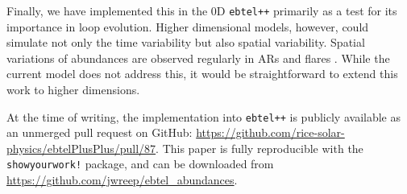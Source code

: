 \documentclass[twocolumn]{aastex631}
\begin{document}
Finally, we have implemented this in the 0D \texttt{ebtel++} primarily as a test for its importance in loop evolution.  Higher dimensional models, however, could simulate not only the time variability but also spatial variability.  Spatial variations of abundances are observed regularly in ARs and flares \citep{doschek2018,baker2021,to2021,long2024}.  While the current model does not address this, it would be straightforward to extend this work to higher dimensions.  


\begin{acknowledgements}
At the time of writing, the implementation into \texttt{ebtel++} is publicly available as an unmerged pull request on GitHub: \url{https://github.com/rice-solar-physics/ebtelPlusPlus/pull/87}.  This paper is fully reproducible with the \texttt{showyourwork!} package, and can be downloaded from \url{https://github.com/jwreep/ebtel_abundances}.  
\end{acknowledgements}




\end{document}
